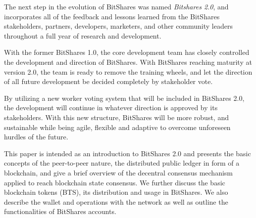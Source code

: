 The next step in the evolution of BitShares was named \emph{Bitshares 2.0}, and
incorporates all of the feedback and lessons learned from the BitShares
stakeholders, partners, developers, marketers, and other community leaders
throughout a full year of research and development.

With the former BitShares 1.0, the core development team has closely controlled
the development and direction of BitShares. With BitShares reaching maturity at
version 2.0, the team is ready to remove the training wheels, and let the
direction of all future development be decided completely by stakeholder vote.

By utilizing a new worker voting system that will be included in BitShares 2.0,
the development will continue in whatever direction is approved by its
stakeholders. With this new structure, BitShares will be more robust, and
sustainable while being agile, flexible and adaptive to overcome unforeseen
hurdles of the future.

This paper is intended as an introduction to BitShares 2.0 and presents the
basic concepts of the peer-to-peer nature, the distributed public ledger in
form of a blockchain, and give a brief overview of the decentral consensus
mechanism applied to reach blockchain state consensus. We further discuss the
basic blockchain tokens (BTS), its distribution and usage in BitShares. We
also describe the wallet and operations with the network as well as outline the
functionalities of BitShares accounts.
